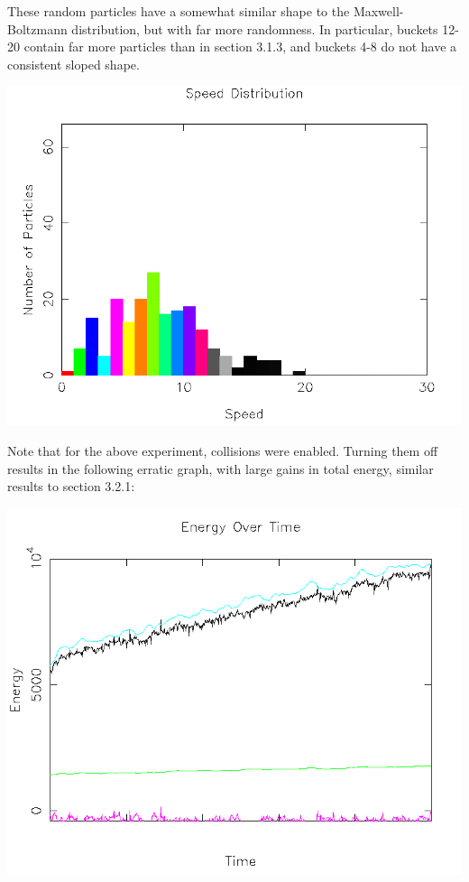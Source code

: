 \documentclass{article}
\begin{document}
These random particles have a somewhat similar shape to the Maxwell-Boltzmann distribution, but with far more randomness.
In particular, buckets 12-20 contain far more particles than in section 3.1.3, and buckets 4-8 do not have a consistent sloped shape.
\\
\begin{center}
    \includegraphics[scale=0.5]{charged_random_dist}
\end{center}


Note that for the above experiment, collisions were enabled.
Turning them off results in the following erratic graph, with large gains in total energy, similar results to section 3.2.1:
\\
\begin{center}
    \includegraphics[scale=0.5]{charged_random_energy_no_collisions}
\end{center}
\end{document}
